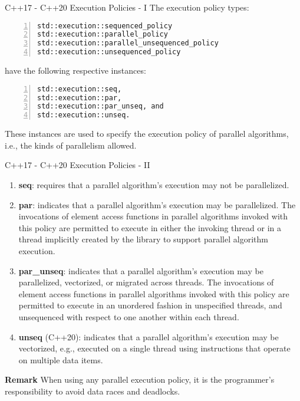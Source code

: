 \documentclass[10pt,aspectratio=169]{beamer}
\begin{document}
\begin{frame}[fragile]{C++17 - C++20 Execution Policies - I}
The execution policy types:
\begin{lstlisting}[frame=single, style=cpp, firstnumber=1, numbers=left, numberstyle=\tiny,showtabs=false,xleftmargin=.05\linewidth,xrightmargin=.025\linewidth]
std::execution::sequenced_policy
std::execution::parallel_policy
std::execution::parallel_unsequenced_policy
std::execution::unsequenced_policy
\end{lstlisting}
have the following respective instances:
\begin{lstlisting}[frame=single, style=cpp, firstnumber=1, numbers=left, numberstyle=\tiny,showtabs=false,xleftmargin=.05\linewidth,xrightmargin=.025\linewidth]
std::execution::seq,
std::execution::par,
std::execution::par_unseq, and
std::execution::unseq.
\end{lstlisting}
These instances are used to specify the execution policy of parallel algorithms, i.e., the kinds of parallelism allowed.
\end{frame}
\begin{frame}{C++17 - C++20 Execution Policies - II}
\begin{enumerate}
    \item \textbf{seq}: requires that a parallel algorithm's execution may not be parallelized.
    \item \textbf{par}: indicates that a parallel algorithm's execution may be parallelized. The invocations of element access functions in parallel algorithms invoked with this policy are permitted to execute in either the invoking thread or in a thread implicitly created by the library to support parallel algorithm execution.
    \item \textbf{par\_unseq}: indicates that a parallel algorithm's execution may be parallelized, vectorized, or migrated across threads. The invocations of element access functions in parallel algorithms invoked with this policy are permitted to execute in an unordered fashion in unspecified threads, and unsequenced with respect to one another within each thread.
    \item \textbf{unseq} (C++20): indicates that a parallel algorithm's execution may be vectorized, e.g., executed on a single thread using instructions that operate on multiple data items.
\end{enumerate}
\vfill
\textbf{Remark} When using any parallel execution policy, it is the programmer's responsibility to avoid data races and deadlocks.
\end{frame}
\end{document}
